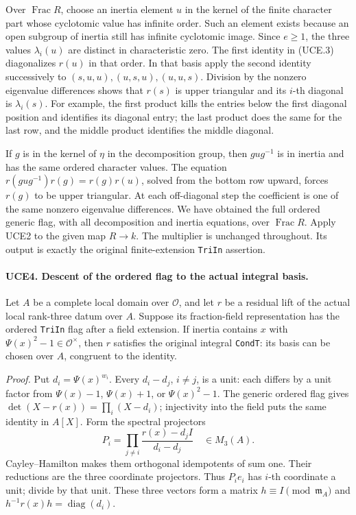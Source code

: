 \documentclass[11pt,a4paper]{article}
\numberwithin{equation}{section}
\theoremstyle{remark}\newtheorem{remark}[theorem]{Remark}
\begin{document}
Over \(\operatorname{Frac}R\), choose an inertia element \(u\)
in the kernel of the finite character part whose cyclotomic value
has infinite order.  Such an element exists because an open subgroup
of inertia still has infinite cyclotomic image.  Since \(e\ge1\),
the three values \(\lambda_i(u)\) are distinct in characteristic
zero.  The first identity in (UCE.3) diagonalizes \(r(u)\) in that
order.  In that basis apply the second identity successively to
\((s,u,u),(u,s,u),(u,u,s)\).  Division by the nonzero eigenvalue
differences shows that \(r(s)\) is upper triangular and its
\(i\)-th diagonal is \(\lambda_i(s)\).  For example, the first
product kills the entries below the first diagonal position and
identifies its diagonal entry; the last product does the same for
the last row, and the middle product identifies the middle diagonal.

If \(g\) is in the kernel of \(\eta\) in the decomposition
group, then \(gug^{-1}\) is in inertia and has the same ordered
character values.  The equation
\(r(gug^{-1})r(g)=r(g)r(u)\), solved from the bottom row upward,
forces \(r(g)\) to be upper triangular.  At each off-diagonal
step the coefficient is one of the same nonzero eigenvalue
differences.  We have obtained the full ordered generic flag,
with all decomposition and inertia equations, over
\(\operatorname{Frac}R\).  Apply UCE2 to the given map \(R\to k\).
The multiplier is unchanged throughout.  Its output is exactly the
original finite-extension \texttt{Tri\allowbreak In} assertion.

\paragraph{UCE4. Descent of the ordered flag to the actual integral basis.}
\label{claim:UCE4}
Let \(A\) be a complete local domain over \(\mathcal O\), and let
\(r\) be a residual lift of the actual local rank-three datum over
\(A\).  Suppose its fraction-field representation has the ordered
\texttt{Tri\allowbreak In} flag after a field extension.  If inertia contains
\(x\) with \(\Psi(x)^2-1\in\mathcal O^\times\), then \(r\)
satisfies the original integral \texttt{Cond\allowbreak T}: its basis can be
chosen over \(A\), congruent to the identity.

\emph{Proof.}
Put \(d_i=\Psi(x)^{w_i}\).  Every \(d_i-d_j\), \(i\ne j\),
is a unit: each differs by a unit factor from \(\Psi(x)-1\),
\(\Psi(x)+1\), or \(\Psi(x)^2-1\).
The generic ordered flag gives
\(\det(X-r(x))=\prod_i(X-d_i)\); injectivity into the field
puts the same identity in \(A[X]\).  Form the spectral projectors
\[
 P_i=\prod_{j\ne i}\frac{r(x)-d_jI}{d_i-d_j}\quad\in M_3(A).
 \tag{UCE.4}
\]
Cayley--Hamilton makes them orthogonal idempotents of sum one.
Their reductions are the three coordinate projectors.  Thus
\(P_i e_i\) has \(i\)-th coordinate a unit; divide by that unit.
These three vectors form a matrix \(h\equiv I\pmod{\mathfrak m_A}\)
and \(h^{-1}r(x)h=\operatorname{diag}(d_i)\).
\end{document}
